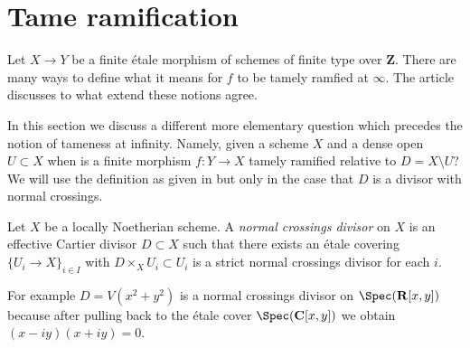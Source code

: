\section{Tame ramification}
\label{section-tame}

\noindent
Let $X \to Y$ be a finite \'etale morphism of schemes of finite type
over $\mathbf{Z}$. There are many ways to define what it means for $f$
to be tamely ramfied at $\infty$. The article \cite{Kerz-Schmidt}
discusses to what extend these notions agree.

\medskip\noindent
In this section we discuss a different more elementary question which
precedes the notion of tameness at infinity. Namely, given a scheme
$X$ and a dense open $U \subset X$ when is a finite  morphism $f : Y \to X$
tamely ramified relative to $D = X \setminus U$? We will use the definition
as given in \cite{Grothendieck-Murre} but only in the case that $D$ is
a divisor with normal crossings.

\begin{definition}
\label{definition-normal-crossings}
Let $X$ be a locally Noetherian scheme. A {\it normal crossings divisor}
on $X$ is an effective Cartier divisor $D \subset X$ such that there
exists an \'etale covering $\{U_i \to X\}_{i \in I}$ with
$D \times_X U_i \subset U_i$ is a strict normal crossings divisor
for each $i$.
\end{definition}

\noindent
For example $D = V(x^2 + y^2)$ is a normal crossings divisor on
$\Spec(\mathbf{R}[x, y])$ because after pulling back to
the \'etale cover $\Spec(\mathbf{C}[x, y])$ we obtain $(x - iy)(x + iy) = 0$.
























